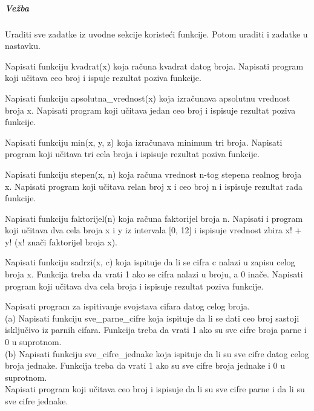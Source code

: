 \subparagraph{Vežba}
Uraditi sve zadatke iz uvodne sekcije koristeći funkcije. Potom uraditi i zadatke u nastavku.

\begin{primer}
Napisati funkciju kvadrat(x) koja računa kvadrat
datog broja. Napisati program koji učitava ceo broj i ispuje rezultat poziva
funkcije.
\end{primer}

\begin{primer}
Napisati funkciju apsolutna\_vrednost(x) koja izračunava apsolutnu vrednost broja x. Napisati program koji učitava jedan ceo broj i ispisuje rezultat poziva funkcije.
\end{primer}

\begin{primer}
Napisati funkciju min(x, y, z) koja izračunava minimum tri broja. Napisati program koji učitava tri cela broja i ispisuje rezultat poziva funkcije.
\end{primer}

\begin{primer}
Napisati funkciju stepen(x, n) koja
računa vrednost n-tog stepena realnog broja x. Napisati program koji učitava
relan broj x i ceo broj n i ispisuje rezultat rada funkcije.
\end{primer}

\begin{primer}
Napisati funkciju faktorijel(n) koja računa
faktorijel broja n. Napisati i program koji učitava dva cela broja x i y iz intervala
[0, 12] i ispisuje vrednost zbira x! + y! (x! znači faktorijel broja x).
\end{primer}

\begin{primer}
Napisati funkciju sadrzi(x, c) koja ispituje
da li se cifra c nalazi u zapisu celog broja x. Funkcija treba da vrati 1 ako se cifra
nalazi u broju, a 0 inače. Napisati program koji učitava dva cela broja i ispisuje
rezultat poziva funkcije.
\end{primer}

\begin{primer}
Napisati program za ispitivanje svojstava cifara datog celog
broja.\\
(a) Napisati funkciju sve\_parne\_cifre koja ispituje da li se dati ceo broj sastoji
isključivo iz parnih cifara. Funkcija treba da vrati 1 ako su sve cifre
broja parne i 0 u suprotnom.\\
(b) Napisati funkciju sve\_cifre\_jednake koja ispituje da li su sve cifre datog
celog broja jednake. Funkcija treba da vrati 1 ako su sve cifre broja jednake
i 0 u suprotnom.\\
Napisati program koji učitava ceo broj i ispisuje da li su sve cifre parne i da li su
sve cifre jednake.
\end{primer}

